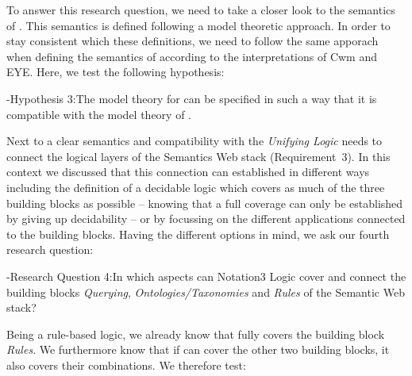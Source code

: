 To answer this research question, we need to take a closer look to the semantics of \rdf \cite{RDFSemantics}. This semantics is defined following a model theoretic approach.
In order  to stay consistent which these definitions, we need to follow the same apporach when defining the semantics of \nthree 
according to the interpretations of Cwm and EYE. %
Here, we test the following hypothesis:

\hyp{Hypothesis 3:}{The model theory for \nthreelogic can be specified in such a way that it is compatible with the model theory of \rdf.}

Next to a clear semantics and compatibility with \rdf the \emph{Unifying Logic} needs to connect the logical layers of the Semantics Web stack (Requirement~3).
In this context we discussed that this connection can established in different ways including the definition of a decidable logic which covers as much of the three building blocks 
as possible
-- knowing that a full coverage can only be established by giving up decidability -- or by focussing on the different applications connected to the building blocks.
Having the different options in mind, we ask our fourth research question:

\hyp{Research Question 4:}{In which aspects can Notation3 Logic cover and connect the building blocks \emph{Querying}, \emph{Ontologies/Taxonomies} and \emph{Rules} 
of the Semantic Web stack?}

Being a rule-based logic, we already know that \nthreelogic fully covers the building block \emph{Rules}. We furthermore know that if
\nthree can cover the other two building blocks, it also covers their combinations.
We therefore test:

